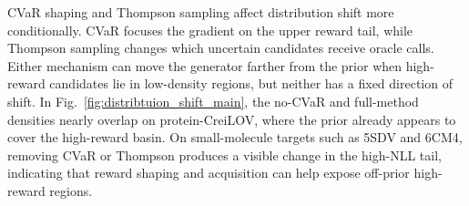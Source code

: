 \documentclass{article}
\begin{document}
CVaR shaping and Thompson sampling affect distribution shift more conditionally. CVaR focuses the gradient on the upper reward tail, while Thompson sampling changes which uncertain candidates receive oracle calls. Either mechanism can move the generator farther from the prior when high-reward candidates lie in low-density regions, but neither has a fixed direction of shift. In Fig.~\ref{fig:distribtuion_shift_main}, the no-CVaR and full-method densities nearly overlap on protein-CreiLOV, where the prior already appears to cover the high-reward basin. On small-molecule targets such as 5SDV and 6CM4, removing CVaR or Thompson produces a visible change in the high-NLL tail, indicating that reward shaping and acquisition can help expose off-prior high-reward regions.
\end{document}
